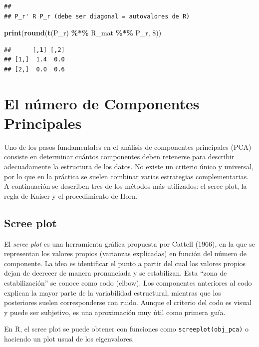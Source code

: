 \documentclass[
]{book}
\newenvironment{Shaded}{\begin{snugshade}}{\end{snugshade}}
\newcommand{\DecValTok}[1]{\textcolor[rgb]{0.00,0.00,0.81}{#1}}
\newcommand{\FunctionTok}[1]{\textcolor[rgb]{0.13,0.29,0.53}{\textbf{#1}}}
\newcommand{\NormalTok}[1]{#1}
\newcommand{\SpecialCharTok}[1]{\textcolor[rgb]{0.81,0.36,0.00}{\textbf{#1}}}
\begin{document}
\begin{verbatim}
## 
## P_r' R P_r (debe ser diagonal = autovalores de R)
\end{verbatim}

\begin{Shaded}
\begin{Highlighting}[]
\FunctionTok{print}\NormalTok{(}\FunctionTok{round}\NormalTok{(}\FunctionTok{t}\NormalTok{(P\_r) }\SpecialCharTok{\%*\%}\NormalTok{ R\_mat }\SpecialCharTok{\%*\%}\NormalTok{ P\_r, }\DecValTok{8}\NormalTok{))}
\end{Highlighting}
\end{Shaded}

\begin{verbatim}
##      [,1] [,2]
## [1,]  1.4  0.0
## [2,]  0.0  0.6
\end{verbatim}

\section{El número de Componentes Principales}\label{el-nuxfamero-de-componentes-principales}

Uno de los pasos fundamentales en el análisis de componentes principales (PCA) consiste en determinar cuántos componentes deben retenerse para describir adecuadamente la estructura de los datos. No existe un criterio único y universal, por lo que en la práctica se suelen combinar varias estrategias complementarias. A continuación se describen tres de los métodos más utilizados: el scree plot, la regla de Kaiser y el procedimiento de Horn.

\subsection{Scree plot}\label{scree-plot}

El \emph{scree plot} es una herramienta gráfica propuesta por Cattell (1966), en la que se representan los valores propios (varianzas explicadas) en función del número de componente. La idea es identificar el punto a partir del cual los valores propios dejan de decrecer de manera pronunciada y se estabilizan. Esta ``zona de estabilización'' se conoce como codo (elbow).
Los componentes anteriores al codo explican la mayor parte de la variabilidad estructural, mientras que los posteriores suelen corresponderse con ruido. Aunque el criterio del codo es visual y puede ser subjetivo, es una aproximación muy útil como primera guía.

En R, el scree plot se puede obtener con funciones como \texttt{screeplot(obj\_pca)} o haciendo un plot usual de los eigenvalores.
\end{document}
